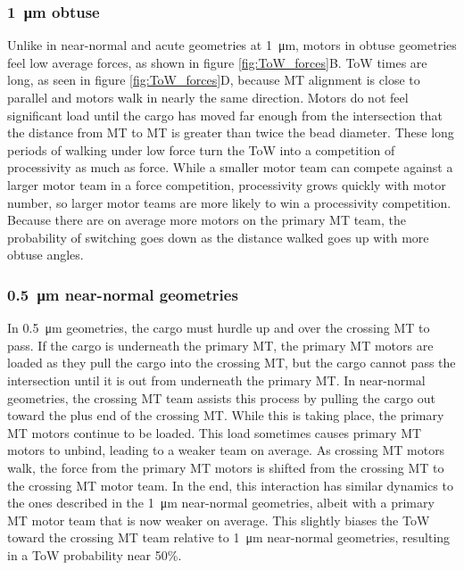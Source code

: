 \subsubsection*{\SI{1}{\micro\meter} obtuse}

Unlike in near-normal and acute geometries at \SI{1}{\micro\meter}, motors in obtuse geometries feel low average forces, as shown in figure \ref{fig:ToW_forces}B. ToW times are long, as seen in figure \ref{fig:ToW_forces}D, because MT alignment is close to parallel and motors walk in nearly the same direction. Motors do not feel significant load until the cargo has moved far enough from the intersection that the distance from MT to MT is greater than twice the bead diameter. These long periods of walking under low force turn the ToW into a competition of processivity as much as force. While a smaller motor team can compete against a larger motor team in a force competition, processivity grows quickly with motor number, so larger motor teams are more likely to win a processivity competition. Because there are on average more motors on the primary MT team, the probability of switching goes down as the distance walked goes up with more obtuse angles.

\subsubsection*{\SI{.5}{\micro\meter} near-normal geometries}

In \SI{.5}{\micro\meter} geometries, the cargo must hurdle up and over the crossing MT to pass. If the cargo is underneath the primary MT, the primary MT motors are loaded as they pull the cargo into the crossing MT, but the cargo cannot pass the intersection until it is out from underneath the primary MT. In near-normal geometries, the crossing MT team assists this process by pulling the cargo out toward the plus end of the crossing MT. While this is taking place, the primary MT motors continue to be loaded. This load sometimes causes primary MT motors to unbind, leading to a weaker team on average. As crossing MT motors walk, the force from the primary MT motors is shifted from the crossing MT to the crossing MT motor team. In the end, this interaction has similar dynamics to the ones described in the \SI{1}{\micro\meter} near-normal geometries, albeit with a primary MT motor team that is now weaker on average. This slightly biases the ToW toward the crossing MT team relative to \SI{1}{\micro\meter} near-normal geometries, resulting in a ToW probability near 50\%.

